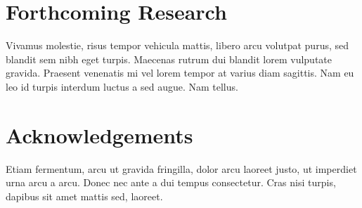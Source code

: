 \documentclass[a0,landscape]{a0poster}
\begin{document}
\begin{multicols}{3}
\section*{Forthcoming Research}

Vivamus molestie, risus tempor vehicula mattis, libero arcu volutpat purus, sed blandit sem nibh eget turpis. Maecenas rutrum dui blandit lorem vulputate gravida. Praesent venenatis mi vel lorem tempor at varius diam sagittis. Nam eu leo id turpis interdum luctus a sed augue. Nam tellus.


\nocite{*} %


\section*{Acknowledgements}

Etiam fermentum, arcu ut gravida fringilla, dolor arcu laoreet justo, ut imperdiet urna arcu a arcu. Donec nec ante a dui tempus consectetur. Cras nisi turpis, dapibus sit amet mattis sed, laoreet.


\end{multicols}
\end{document}
